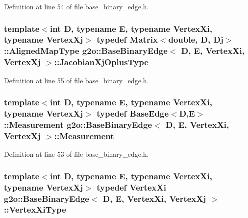 Definition at line 54 of file base\+\_\+binary\+\_\+edge.\+h.

\subsubsection[{\texorpdfstring{Jacobian\+Xj\+Oplus\+Type}{JacobianXjOplusType}}]{\setlength{\rightskip}{0pt plus 5cm}template$<$int D, typename E, typename Vertex\+Xi, typename Vertex\+Xj$>$ typedef Matrix$<$double, D, {\bf Dj}$>$\+::Aligned\+Map\+Type {\bf g2o\+::\+Base\+Binary\+Edge}$<$ D, E, Vertex\+Xi, Vertex\+Xj $>$\+::{\bf Jacobian\+Xj\+Oplus\+Type}}\hypertarget{classg2o_1_1BaseBinaryEdge_a83e5dec2135b33e86255c87be3b5d062}{}\label{classg2o_1_1BaseBinaryEdge_a83e5dec2135b33e86255c87be3b5d062}


Definition at line 55 of file base\+\_\+binary\+\_\+edge.\+h.

\subsubsection[{\texorpdfstring{Measurement}{Measurement}}]{\setlength{\rightskip}{0pt plus 5cm}template$<$int D, typename E, typename Vertex\+Xi, typename Vertex\+Xj$>$ typedef {\bf Base\+Edge}$<$D,E$>$\+::{\bf Measurement} {\bf g2o\+::\+Base\+Binary\+Edge}$<$ D, E, Vertex\+Xi, Vertex\+Xj $>$\+::{\bf Measurement}}\hypertarget{classg2o_1_1BaseBinaryEdge_ac1e9249e9906747a6669a9c90013944b}{}\label{classg2o_1_1BaseBinaryEdge_ac1e9249e9906747a6669a9c90013944b}


Definition at line 53 of file base\+\_\+binary\+\_\+edge.\+h.

\subsubsection[{\texorpdfstring{Vertex\+Xi\+Type}{VertexXiType}}]{\setlength{\rightskip}{0pt plus 5cm}template$<$int D, typename E, typename Vertex\+Xi, typename Vertex\+Xj$>$ typedef Vertex\+Xi {\bf g2o\+::\+Base\+Binary\+Edge}$<$ D, E, Vertex\+Xi, Vertex\+Xj $>$\+::{\bf Vertex\+Xi\+Type}}\hypertarget{classg2o_1_1BaseBinaryEdge_aa8e2b04b2c0c90adc48384d6d41063cc}{}\label{classg2o_1_1BaseBinaryEdge_aa8e2b04b2c0c90adc48384d6d41063cc}


